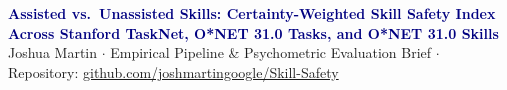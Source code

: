\documentclass[9pt,letterpaper]{extarticle}
\begin{document}
\begin{center}
    {\Large\sffamily\bfseries\textcolor{navy}{Assisted vs.\ Unassisted Skills: Certainty-Weighted Skill Safety Index Across Stanford TaskNet, O*NET 31.0 Tasks, and O*NET 31.0 Skills}}\\[2pt]
    {\footnotesize\sffamily Joshua Martin $\cdot$ Empirical Pipeline \& Psychometric Evaluation Brief $\cdot$ Repository: \href{https://github.com/joshmartingoogle/Skill-Safety}{github.com/joshmartingoogle/Skill-Safety}}
\end{center}
\vspace{-4pt}
\end{document}
